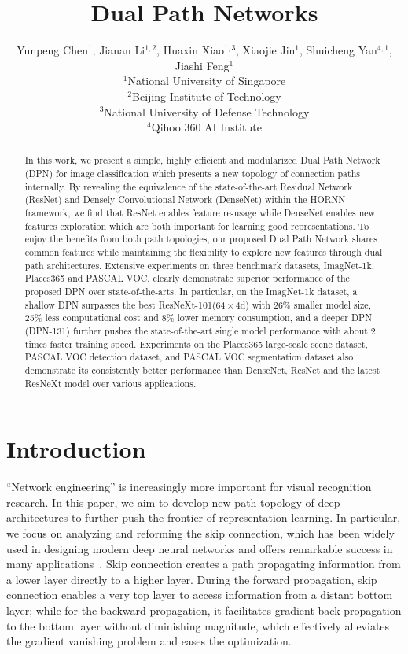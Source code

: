 \documentclass{article}
\title{Dual Path Networks}
\author{
  Yunpeng Chen$^{1}$, Jianan Li$^{1,2}$, Huaxin Xiao$^{1,3}$, Xiaojie Jin$^{1}$, Shuicheng Yan$^{4,1}$, Jiashi Feng$^{1}$  \\
  $^{1}$National University of Singapore \\
  $^{2}$Beijing Institute of Technology \\
  $^{3}$National University of Defense Technology \\
  $^{4}$Qihoo 360 AI Institute\\
}
\begin{document}

\maketitle
\begin{abstract}
In this work, we present a simple, highly efficient and modularized Dual Path Network (DPN) for image classification which presents a new topology of connection paths internally. By revealing the equivalence of the state-of-the-art Residual Network (ResNet) and Densely Convolutional Network (DenseNet) within the HORNN framework, we find that ResNet enables feature re-usage while DenseNet enables new features exploration which are both important for learning good representations. To enjoy the benefits from both path topologies, our proposed Dual Path Network shares common features while maintaining the flexibility to explore new features through dual path architectures. Extensive experiments on three benchmark datasets, ImagNet-1k, Places365 and PASCAL VOC, clearly demonstrate superior performance of the proposed DPN over state-of-the-arts. In particular, on the ImagNet-1k dataset, a shallow DPN surpasses the best ResNeXt-101($64\times4$d) with 26\% smaller model size, 25\% less computational cost and 8\% lower memory consumption, and a deeper DPN (DPN-131) further pushes the state-of-the-art single model performance with about 2 times faster training speed. Experiments on the Places365 large-scale scene dataset, PASCAL VOC detection dataset, and PASCAL VOC segmentation dataset also demonstrate its consistently better performance than DenseNet, ResNet and the latest ResNeXt model over various applications. 
\end{abstract}

% 
%
%
%


\section{Introduction}

``Network engineering'' is increasingly more important for visual recognition research. In this paper, we aim to develop new path topology of deep architectures to further push the frontier of representation learning. In particular, we focus on analyzing and reforming the skip connection, which has been widely used in designing modern deep neural networks and offers remarkable success in many applications~\citep{ren2015faster,he2017mask,szegedy2016inception,newell2016stacked,he2016deep}. Skip connection creates a path propagating information from a lower layer directly to a higher layer. During the forward propagation, skip connection enables a very top layer to access information from a distant bottom layer; while for the backward propagation, it facilitates gradient back-propagation to the bottom layer without diminishing magnitude, which effectively alleviates the gradient vanishing problem and eases the optimization. 
\end{document}
